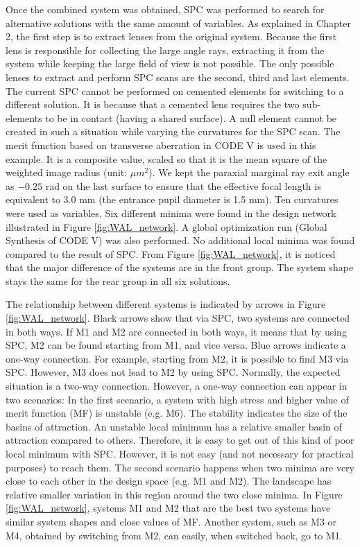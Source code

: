 Once the combined system was obtained, SPC was performed to search for alternative solutions with the same amount of variables. As explained in Chapter 2, the first step is to extract lenses from the original system. Because the first lens is responsible for collecting the large angle rays, extracting it from the system while keeping the large field of view is not possible. The only possible lenses to extract and perform SPC scans are the second, third and last elements. The current SPC cannot be performed on cemented elements for switching to a different solution. It is because that a cemented lens requires the two sub-elements to be in contact (having a shared surface). A null element cannot be created in such a situation while varying the curvatures for the SPC scan. The merit function based on transverse aberration in CODE V is used in this example. It is a composite value, scaled so that it is the mean square of the weighted image radius (unit: $\mu m^2$). We kept the paraxial marginal ray exit angle as $-0.25$ rad on the last surface to ensure that the effective focal length is equivalent to $3.0$ mm (the entrance pupil diameter is 1.5 mm). Ten curvatures were used as variables. Six different minima were found in the design network illustrated in Figure \ref{fig:WAL_network}. A global optimization run (Global Synthesis of CODE V) was also performed. No additional local minima was found compared to the result of SPC. From Figure \ref{fig:WAL_network}, it is noticed that the major difference of the systems are in the front group. The system shape stays the same for the rear group in all six solutions.

The relationship between different systems is indicated by arrows in Figure \ref{fig:WAL_network}. Black arrows show that via SPC, two systems are connected in both ways. If M1 and M2 are connected in both ways, it means that by using SPC, M2 can be found starting from M1, and vice versa. Blue arrows indicate a one-way connection. For example, starting from M2, it is possible to find M3 via SPC. However, M3 does not lead to M2 by using SPC. Normally, the expected situation is a two-way connection. However, a one-way connection can appear in two scenarios: In the first scenario, a system with high stress and higher value of merit function (MF) is unstable (e.g. M6). The stability indicates the size of the basins of attraction. An unstable local minimum has a relative smaller basin of attraction compared to others. Therefore, it is easy to get out of this kind of poor local minimum with SPC. However, it is not easy (and not necessary for practical purposes) to reach them. The second scenario happens when two minima are very close to each other in the design space (e.g. M1 and M2). The landscape has relative smaller variation in this region around the two close minima. In Figure \ref{fig:WAL_network}, systems M1 and M2 that are the best two systems have similar system shapes and close values of MF. Another system, such as M3 or M4, obtained by switching from M2, can easily, when switched back, go to M1. 

